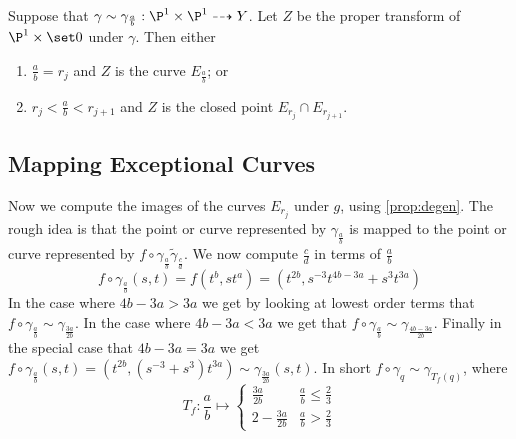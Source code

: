 \documentclass[11pt, final]{amsart}
\newcommand{\dashto}{\dashrightarrow}
\begin{document}
\begin{prop}\label{prop:degen}
Suppose that $\gamma \sim \gamma_{\frac ab} : \P^1\times \P^1 \dashto Y$. Let $Z$ be the proper transform of $\P^1 \times \set 0$ under $\gamma$. Then either
\begin{enumerate}
 \item $\frac ab = r_j$ and $Z$ is the curve $E_{\frac ab}$; or
 \item $r_j < \frac ab < r_{j+1}$ and $Z$ is the closed point $E_{r_j}\cap E_{r_{j+1}}$.
\end{enumerate}
\end{prop}


\subsection{Mapping Exceptional Curves}\label{sec:mapexc}

Now we compute the images of the curves $E_{r_j}$ under $g$, using \autoref{prop:degen}. The rough idea is that the point or curve represented by $\gamma_{\frac ab}$ is mapped to the point or curve represented by $f \circ \gamma_{\frac ab} \tilde \gamma_{\frac cd}$. We now compute $\frac cd$ in terms of $\frac ab$ %
%
 \[f\circ \gamma_{\frac ab}(s, t) = f(t^b, st^a) = \left(t^{2b}, s^{-3}t^{4b-3a} + s^3t^{3a}\right)\]
In the case where $4b-3a > 3a$ we get by looking at lowest order terms that $f\circ \gamma_{\frac ab} \sim \gamma_{\frac {3a}{2b}}$. In the case where $4b-3a < 3a$ we get that $f\circ \gamma_{\frac ab} \sim \gamma_{\frac {4b-3a}{2b}}$. Finally in the special case that $4b-3a = 3a$ we get $f\circ \gamma_{\frac ab}(s, t) = \left(t^{2b}, (s^{-3}+ s^3)t^{3a}\right) \sim \gamma_{\frac {3a}{2b}}(s, t)$. 
In short $f \circ \gamma_q \sim \gamma_{T_f(q)}$, where
\[T_f : \frac ab\longmapsto 
\begin{cases}
 \frac {3a}{2b} & \frac ab \le \frac 23\\
 2 - \frac {3a}{2b} & \frac ab > \frac 23
\end{cases}
\]
\end{document}
